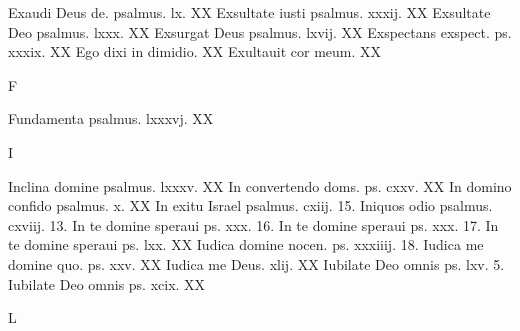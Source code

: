 \documentclass[a5paper,10pt]{book}
\begin{document}
\begin{multicols}{2}
\newline Exaudi Deus de. psalmus. lx. \hfill XX
\newline Exsultate iusti psalmus. xxxij. \hfill XX
\newline Exsultate Deo psalmus. lxxx. \hfill XX
\newline Exsurgat Deus psalmus. lxvij. \hfill XX
\newline Exspectans exspect. ps. xxxix. \hfill XX
\newline Ego dixi in dimidio. \hfill XX
\newline Exultauit cor meum. \hfill XX
\newline \vspace{-1.75em}
\begin{center}
\color{red} F
\end{center}
\vspace{-.75em}
\par \noindent Fundamenta psalmus. lxxxvj. \hfill XX
\newline \vspace{-1.75em}
\begin{center}
\color{red} I
\end{center}
\vspace{-.75em}
\par \noindent Inclina domine psalmus. lxxxv. \hfill XX
\newline In convertendo doms. ps. cxxv. \hfill XX
\newline In domino confido psalmus. x. \hfill XX
\newline In exitu Israel psalmus. cxiij. \hfill 15.
\newline Iniquos odio psalmus. cxviij. \hfill 13.
\newline In te domine speraui ps. xxx. \hfill 16.
\newline In te domine speraui ps. xxx. \hfill 17.
\newline In te domine speraui ps. lxx. \hfill XX
\newline Iudica domine nocen. ps. xxxiiij. \hfill 18.
\newline Iudica me domine quo. ps. xxv. \hfill XX
\newline Iudica me Deus. xlij. \hfill XX
\newline Iubilate Deo omnis ps. lxv. \hfill 5.
\newline Iubilate Deo omnis ps. xcix. \hfill XX
\newline \vspace{-1.75em}
\begin{center}
\color{red} L

\end{center}
\end{multicols}
\end{document}
